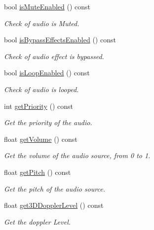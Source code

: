 \begin{DoxyCompactItemize}
bool \hyperlink{class_i_dream_sky_1_1_audio_source_base_a621c2d2081d06980314cfd0cbca47abb}{is\+Mute\+Enabled} () const 
\begin{DoxyCompactList}\small\item\em Check of audio is Muted. \end{DoxyCompactList}\item 
bool \hyperlink{class_i_dream_sky_1_1_audio_source_base_ac88502844fe48dee7fcecb82bc784b15}{is\+Bypass\+Effects\+Enabled} () const 
\begin{DoxyCompactList}\small\item\em Check of audio effect is bypassed. \end{DoxyCompactList}\item 
bool \hyperlink{class_i_dream_sky_1_1_audio_source_base_a3bc651b14d433eeb38b170a35f8065d2}{is\+Loop\+Enabled} () const 
\begin{DoxyCompactList}\small\item\em Check of audio is looped. \end{DoxyCompactList}\item 
int \hyperlink{class_i_dream_sky_1_1_audio_source_base_a92c0b80da27c9767a3f5cffb2d269533}{get\+Priority} () const 
\begin{DoxyCompactList}\small\item\em Get the priority of the audio. \end{DoxyCompactList}\item 
float \hyperlink{class_i_dream_sky_1_1_audio_source_base_a6109b9701bcccd30cf12384f3ee74264}{get\+Volume} () const 
\begin{DoxyCompactList}\small\item\em Get the volume of the audio source, from 0 to 1. \end{DoxyCompactList}\item 
float \hyperlink{class_i_dream_sky_1_1_audio_source_base_a55b153ae8bf8b5a6130fd3dd703d3b77}{get\+Pitch} () const 
\begin{DoxyCompactList}\small\item\em Get the pitch of the audio source. \end{DoxyCompactList}\item 
float \hyperlink{class_i_dream_sky_1_1_audio_source_base_a41b350acdf0d86b4770e2ad82d38c940}{get3\+D\+Doppler\+Level} () const 
\begin{DoxyCompactList}\small\item\em Get the doppler Level. \end{DoxyCompactList}\item 

\end{DoxyCompactItemize}
